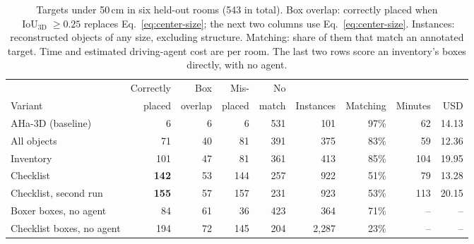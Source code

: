 \begin{table}[!htbp]
\centering\small\setlength{\tabcolsep}{4pt}
\caption{Targets under 50\,cm in six held-out rooms (543 in total).
Box overlap: correctly placed when $\operatorname{IoU}_{3\mathrm{D}}\ge 0.25$ replaces
Eq.~\ref{eq:center-size}; the next two columns use Eq.~\ref{eq:center-size}.
Instances: reconstructed objects of any size, excluding structure. Matching:
share of them that match an annotated target. Time and estimated
driving-agent cost are per room. The last two rows score an inventory's boxes
directly, with no agent.}
\label{tab:six-rooms}
\begin{tabular}{lrrrrrrrr}
\toprule
& Correctly & Box & Mis- & No & & & & \\
Variant & placed & overlap & placed & match & Instances & Matching & Minutes & USD \\
\midrule
AHa-3D (baseline) & 6 & 6 & 6 & 531 & 101 & 97\% & 62 & 14.13 \\
All objects & 71 & 40 & 81 & 391 & 375 & 83\% & 59 & 12.36 \\
Inventory & 101 & 47 & 81 & 361 & 413 & 85\% & 104 & 19.95 \\
Checklist & \textbf{142} & 53 & 144 & 257 & 922 & 51\% & 79 & 13.28 \\
Checklist, second run & \textbf{155} & 57 & 157 & 231 & 923 & 53\% & 113 & 20.15 \\
\midrule
Boxer boxes, no agent & 84 & 61 & 36 & 423 & 364 & 71\% & -- & -- \\
Checklist boxes, no agent & 194 & 72 & 145 & 204 & 2{,}287 & 23\% & -- & -- \\
\bottomrule
\end{tabular}
\end{table}


